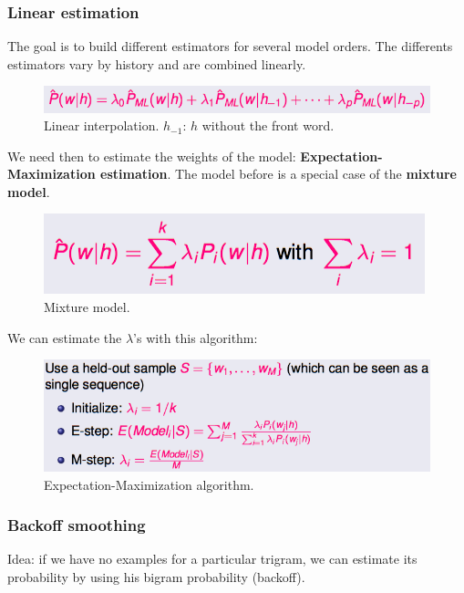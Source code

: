 \subsubsection{Linear estimation}

The goal is to build different estimators for several model orders. The differents estimators vary by history and are combined linearly.

\begin{figure}[htp]
	\centering
	\includegraphics[scale=0.5]{images/15_linear.png}
 	\caption{Linear interpolation. $h_{-1}$: $h$ without the front word.}
\end{figure}

We need then to estimate the weights of the model: \textbf{Expectation-Maximization estimation}. The model before is a special case of the \textbf{mixture model}.

\begin{figure}[H]
	\centering
	\includegraphics[scale=0.5]{images/16_mixture.png}
 	\caption{Mixture model.}
\end{figure}

We can estimate the $\lambda$'s with this algorithm:

\begin{figure}[htp]
	\centering
	\includegraphics[scale=0.5]{images/17_em.png}
 	\caption{Expectation-Maximization algorithm.}
\end{figure}

\subsubsection{Backoff smoothing}

Idea: if we have no examples for a particular trigram, we can estimate its probability by using his bigram probability (backoff). 

